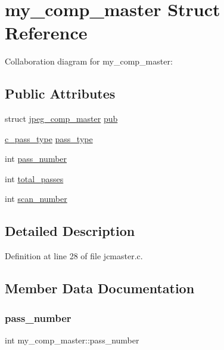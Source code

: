 \hypertarget{structmy__comp__master}{}\section{my\+\_\+comp\+\_\+master Struct Reference}
\label{structmy__comp__master}


Collaboration diagram for my\+\_\+comp\+\_\+master\+:
\subsection*{Public Attributes}
\begin{DoxyCompactItemize}
\item 
struct \mbox{\hyperlink{structjpeg__comp__master}{jpeg\+\_\+comp\+\_\+master}} \mbox{\hyperlink{structmy__comp__master_a92f91e2f4b79fd0e6ae36f24d8f455f0}{pub}}
\item 
\mbox{\hyperlink{jcmaster_8c_af81b2e4b6a71dd23a30397fe937b84d5}{c\+\_\+pass\+\_\+type}} \mbox{\hyperlink{structmy__comp__master_ab153ff271327de71553b428d057e991b}{pass\+\_\+type}}
\item 
int \mbox{\hyperlink{structmy__comp__master_a08c52f446296c1890808382af30ae43d}{pass\+\_\+number}}
\item 
int \mbox{\hyperlink{structmy__comp__master_abc21ff7e11e64247ad8ff68ad819e9fc}{total\+\_\+passes}}
\item 
int \mbox{\hyperlink{structmy__comp__master_a85aabce3d888eccfaf21eeb8c5cc8606}{scan\+\_\+number}}
\end{DoxyCompactItemize}


\subsection{Detailed Description}


Definition at line 28 of file jcmaster.\+c.



\subsection{Member Data Documentation}
\mbox{\label{structmy__comp__master_a08c52f446296c1890808382af30ae43d}} 
\subsubsection{\texorpdfstring{pass\_number}{pass\_number}}
{\footnotesize\ttfamily int my\+\_\+comp\+\_\+master\+::pass\+\_\+number}



